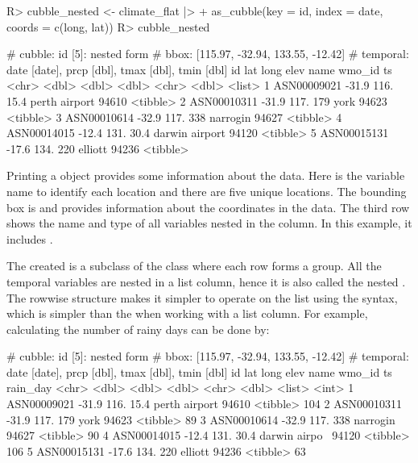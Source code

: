 \documentclass[
  shortnames]{jss}
\begin{document}
\begin{CodeChunk}
\begin{CodeInput}
R> cubble_nested <- climate_flat |>
+   as_cubble(key = id, index = date, coords = c(long, lat))
R> cubble_nested
\end{CodeInput}
\begin{CodeOutput}
# cubble:   id [5]: nested form
# bbox:     [115.97, -32.94, 133.55, -12.42]
# temporal: date [date], prcp [dbl], tmax [dbl], tmin [dbl]
  id            lat  long  elev name           wmo_id ts      
  <chr>       <dbl> <dbl> <dbl> <chr>           <dbl> <list>  
1 ASN00009021 -31.9  116.  15.4 perth airport   94610 <tibble>
2 ASN00010311 -31.9  117. 179   york            94623 <tibble>
3 ASN00010614 -32.9  117. 338   narrogin        94627 <tibble>
4 ASN00014015 -12.4  131.  30.4 darwin airport  94120 <tibble>
5 ASN00015131 -17.6  134. 220   elliott         94236 <tibble>
\end{CodeOutput}
\end{CodeChunk}

Printing a  object provides some information about the data. Here  is the variable name to identify each location and there are five unique locations. The bounding box is \code{[115.97, -32.94, 133.55, -12.42]} and provides information about the coordinates in the data. The third row shows the name and type of all variables nested in the  column. In this example, it includes .

The created  is a subclass of the  class where each row forms a group. All the temporal variables are nested in a list column, hence it is also called the nested . The rowwise structure makes it simpler to operate on the list using the  syntax, which is simpler than the  when working with a list column. For example, calculating the number of rainy days can be done by:

\begin{CodeChunk}
\begin{CodeOutput}
# cubble:   id [5]: nested form
# bbox:     [115.97, -32.94, 133.55, -12.42]
# temporal: date [date], prcp [dbl], tmax [dbl], tmin [dbl]
  id            lat  long  elev name          wmo_id ts       rain_day
  <chr>       <dbl> <dbl> <dbl> <chr>          <dbl> <list>      <int>
1 ASN00009021 -31.9  116.  15.4 perth airport  94610 <tibble>      104
2 ASN00010311 -31.9  117. 179   york           94623 <tibble>       89
3 ASN00010614 -32.9  117. 338   narrogin       94627 <tibble>       90
4 ASN00014015 -12.4  131.  30.4 darwin airpo~  94120 <tibble>      106
5 ASN00015131 -17.6  134. 220   elliott        94236 <tibble>       63
\end{CodeOutput}
\end{CodeChunk}
\end{document}
